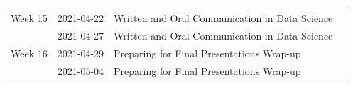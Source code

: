 \documentclass[
]{book}
\begin{document}
\begin{longtable}[]{@{}llll@{}}
\begin{minipage}[t]{0.22\columnwidth}
\end{minipage} & \begin{minipage}[t]{0.22\columnwidth}\raggedright
\strut
\end{minipage}\tabularnewline
\begin{minipage}[t]{0.22\columnwidth}\raggedright
Week 15\strut
\end{minipage} & \begin{minipage}[t]{0.22\columnwidth}\raggedright
2021-04-22\strut
\end{minipage} & \begin{minipage}[t]{0.22\columnwidth}\raggedright
Written and Oral Communication in Data Science\strut
\end{minipage} & \begin{minipage}[t]{0.22\columnwidth}\raggedright
\strut
\end{minipage}\tabularnewline
\begin{minipage}[t]{0.22\columnwidth}\raggedright
\strut
\end{minipage} & \begin{minipage}[t]{0.22\columnwidth}\raggedright
2021-04-27\strut
\end{minipage} & \begin{minipage}[t]{0.22\columnwidth}\raggedright
Written and Oral Communication in Data Science\strut
\end{minipage} & \begin{minipage}[t]{0.22\columnwidth}\raggedright
\strut
\end{minipage}\tabularnewline
\begin{minipage}[t]{0.22\columnwidth}\raggedright
Week 16\strut
\end{minipage} & \begin{minipage}[t]{0.22\columnwidth}\raggedright
2021-04-29\strut
\end{minipage} & \begin{minipage}[t]{0.22\columnwidth}\raggedright
Preparing for Final Presentations Wrap-up\strut
\end{minipage} & \begin{minipage}[t]{0.22\columnwidth}\raggedright
\strut
\end{minipage}\tabularnewline
\begin{minipage}[t]{0.22\columnwidth}\raggedright
\strut
\end{minipage} & \begin{minipage}[t]{0.22\columnwidth}\raggedright
2021-05-04\strut
\end{minipage} & \begin{minipage}[t]{0.22\columnwidth}\raggedright
Preparing for Final Presentations Wrap-up\strut
\end{minipage} & \begin{minipage}[t]{0.22\columnwidth}\raggedright
\strut
\end{minipage}\tabularnewline
\bottomrule
\end{longtable}
\end{document}
